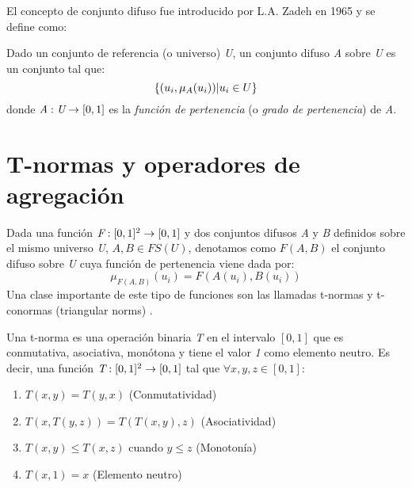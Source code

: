El concepto de conjunto difuso fue introducido por L.A. Zadeh en 1965 \cite{Zadeh65} y se define como:
\begin{definition}
Dado un conjunto de referencia (o universo) \emph{U}, un conjunto difuso \emph{A} sobre \emph{U} es un conjunto tal que:\\
\begin{equation}
\{(u_{i},\mu_{A}(u_{i}))\arrowvert u_{i} \in U\}
\end{equation}
donde \begin{math}\emph{A}:\emph{U}\rightarrow[0,1]\end{math} es la \emph{función de pertenencia} (o \emph{grado de pertenencia}) de \emph{A}.
\end{definition}

\section{T-normas y operadores de agregación}\label{sec:t-norms-aggregation-operator}
Dada una función \begin{math}\emph{F}:[0,1]^2\rightarrow[0,1]\end{math} y dos conjuntos difusos \emph{A} y \emph{B} definidos sobre el mismo universo \emph{U}, \begin{math}A,B\in FS(U)\end{math}, denotamos como \begin{math}F(A,B)\end{math} el conjunto difuso sobre \emph{U} cuya función de pertenencia viene dada por:
\begin{equation}
\mu_{F(A,B)}(u_{i}) = F(A(u_{i}),B(u_{i}))
\end{equation}
Una clase importante de este tipo de funciones son las llamadas t-normas y t-conormas (triangular norms) \cite{klement2000triangular}.
\begin{definition}\label{def:tnorma}
Una t-norma es una operación binaria \emph{T} en el intervalo $[0,1]$ que es conmutativa, asociativa, monótona y tiene el valor \emph{1} como elemento neutro. Es decir, una función $\emph{T} : [0,1]^2 \rightarrow [0,1]$ tal que $\forall x,y,z \in [0,1]$:
\begin{enumerate}[label=(T\arabic*),ref=(T\arabic*)]
   \item $T(x,y) = T(y,x)$ (Conmutatividad)\label{T1}
   \item $T(x,T(y,z)) = T(T(x,y),z)$ (Asociatividad)\label{T2}
   \item $T(x,y) \leq T(x,z)$ cuando $y \leq z$ (Monotonía)\label{T3}
   \item $T(x,1) = x$ (Elemento neutro)\label{T4}
  \end{enumerate}
\end{definition}
